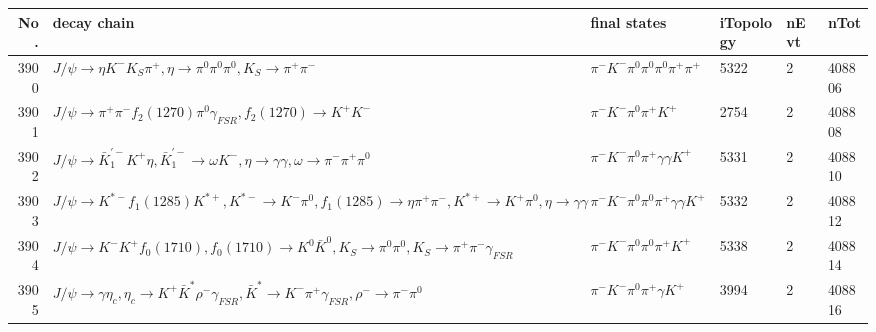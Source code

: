 \begin{table}[htbp] 
\begin{center}
\begin{small}
\begin{tabular}{rlllll}\hline\hline
 No. & decay chain & final states &  iTopology & nEvt & nTot \\\hline
3900&$J/\psi       \rightarrow \eta          K^{-}          K_{S}          \pi^{+}        , \eta           \rightarrow \pi^{0}        \pi^{0}        \pi^{0}        , K_{S}           \rightarrow \pi^{+}        \pi^{-}        $&$\pi^{-}        K^{-}          \pi^{0}        \pi^{0}        \pi^{0}        \pi^{+}        \pi^{+}        $& 5322&    2&408806\\
3901&$J/\psi       \rightarrow \pi^{+}        \pi^{-}        f_{2}(1270)    \pi^{0}        \gamma_{FSR} , f_{2}(1270)     \rightarrow K^{+}          K^{-}          $&$\pi^{-}        K^{-}          \pi^{0}        \pi^{+}        K^{+}          $& 2754&    2&408808\\
3902&$J/\psi       \rightarrow \bar{K}_1^{'-}K^{+}          \eta          , \bar{K}_1^{'-} \rightarrow \omega         K^{-}          , \eta           \rightarrow \gamma       \gamma       , \omega          \rightarrow \pi^{-}        \pi^{+}        \pi^{0}        $&$\pi^{-}        K^{-}          \pi^{0}        \pi^{+}        \gamma       \gamma       K^{+}          $& 5331&    2&408810\\
3903&$J/\psi       \rightarrow K^{*-}         f_{1}(1285)    K^{*+}         , K^{*-}          \rightarrow K^{-}          \pi^{0}        , f_{1}(1285)     \rightarrow \eta          \pi^{+}        \pi^{-}        , K^{*+}          \rightarrow K^{+}          \pi^{0}        , \eta           \rightarrow \gamma       \gamma       $&$\pi^{-}        K^{-}          \pi^{0}        \pi^{0}        \pi^{+}        \gamma       \gamma       K^{+}          $& 5332&    2&408812\\
3904&$J/\psi       \rightarrow K^{-}          K^{+}          f_{0}(1710)    , f_{0}(1710)     \rightarrow K^{0}          \bar{K}^{0}   , K_{S}           \rightarrow \pi^{0}        \pi^{0}        , K_{S}           \rightarrow \pi^{+}        \pi^{-}        \gamma_{FSR} $&$\pi^{-}        K^{-}          \pi^{0}        \pi^{0}        \pi^{+}        K^{+}          $& 5338&    2&408814\\
3905&$J/\psi       \rightarrow \gamma       \eta_{c}    , \eta_{c}     \rightarrow K^{+}          \bar{K}^{*}   \rho^{-}      \gamma_{FSR} , \bar{K}^{*}    \rightarrow K^{-}          \pi^{+}        \gamma_{FSR} , \rho^{-}       \rightarrow \pi^{-}        \pi^{0}        $&$\pi^{-}        K^{-}          \pi^{0}        \pi^{+}        \gamma       K^{+}          $& 3994&    2&408816\\

\end{tabular}
\end{small}
\end{center}
\end{table}
